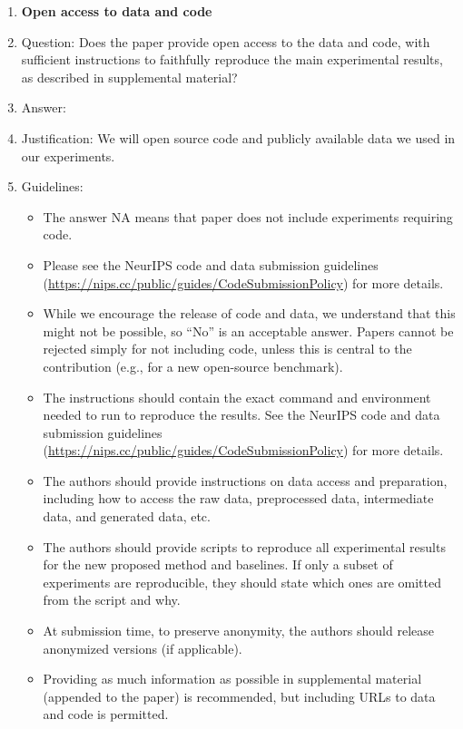 \documentclass{article}
\begin{document}
\begin{enumerate}
\item {\bf Open access to data and code}
    \item[] Question: Does the paper provide open access to the data and code, with sufficient instructions to faithfully reproduce the main experimental results, as described in supplemental material?
    \item[] Answer: \answerYes{} %
    \item[] Justification: We will open source code and publicly available data we used in our experiments.
    \item[] Guidelines:
    \begin{itemize}
        \item The answer NA means that paper does not include experiments requiring code.
        \item Please see the NeurIPS code and data submission guidelines (\url{https://nips.cc/public/guides/CodeSubmissionPolicy}) for more details.
        \item While we encourage the release of code and data, we understand that this might not be possible, so “No” is an acceptable answer. Papers cannot be rejected simply for not including code, unless this is central to the contribution (e.g., for a new open-source benchmark).
        \item The instructions should contain the exact command and environment needed to run to reproduce the results. See the NeurIPS code and data submission guidelines (\url{https://nips.cc/public/guides/CodeSubmissionPolicy}) for more details.
        \item The authors should provide instructions on data access and preparation, including how to access the raw data, preprocessed data, intermediate data, and generated data, etc.
        \item The authors should provide scripts to reproduce all experimental results for the new proposed method and baselines. If only a subset of experiments are reproducible, they should state which ones are omitted from the script and why.
        \item At submission time, to preserve anonymity, the authors should release anonymized versions (if applicable).
        \item Providing as much information as possible in supplemental material (appended to the paper) is recommended, but including URLs to data and code is permitted.
    \end{itemize}



\end{enumerate}
\end{document}
